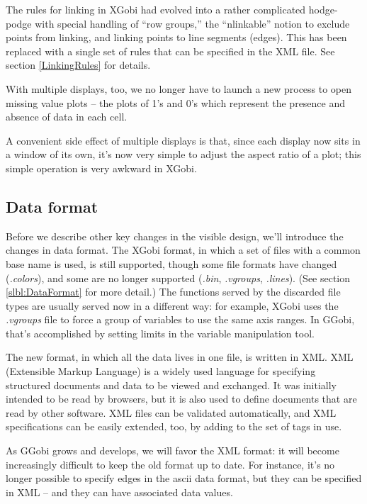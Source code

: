 \documentclass[11pt]{article}
\begin{document}
The rules for linking in XGobi had evolved into a rather complicated
hodge-podge with special handling of ``row groups,'' the
``nlinkable'' notion to exclude points from linking, and linking
points to line segments (edges).  This has been replaced with a single set
of rules that can be specified in the XML file.  See section 
\ref{LinkingRules} for details.

With multiple displays, too, we no longer have to launch a new
process to open missing value plots -- the plots of 1's and 0's
which represent the presence and absence of data in each cell.

A convenient side effect of multiple displays is that, since each
display now sits in a window of its own, it's now very simple to
adjust the aspect ratio of a plot; this simple operation is very
awkward in XGobi.

\subsection {Data format}

Before we describe other key changes in the visible design, we'll
introduce the changes in data format.  The XGobi format, in which a
set of files with a common base name is used, is still supported,
though some file formats have changed ({\em .colors}), and some are no
longer supported ({\em .bin}, {\em .vgroups}, {\em .lines}).  (See
section \ref{slbl:DataFormat} for more detail.) The functions served
by the discarded file types are usually served now in a different
way:  for example, XGobi uses the {\em .vgroups} file to force
a group of variables to use the same axis ranges.  In GGobi, that's
accomplished by setting limits in the variable manipulation tool.

The new format, in which all the data lives in one file, is written
in XML.  XML (Extensible Markup Language) is a widely used language
for specifying structured documents and data to be viewed and
exchanged.  It was initially intended to be read by browsers, but it
is also used to define documents that are read by other software.
XML files can be validated automatically, and XML specifications can
be easily extended, too, by adding to the set of tags in use.

As GGobi grows and develops, we will favor the XML format:  it
will become increasingly difficult to keep the old format up to
date.  For instance, it's no longer possible to specify edges
in the ascii data format, but they can be specified in XML -- and
they can have associated data values.
\end{document}
